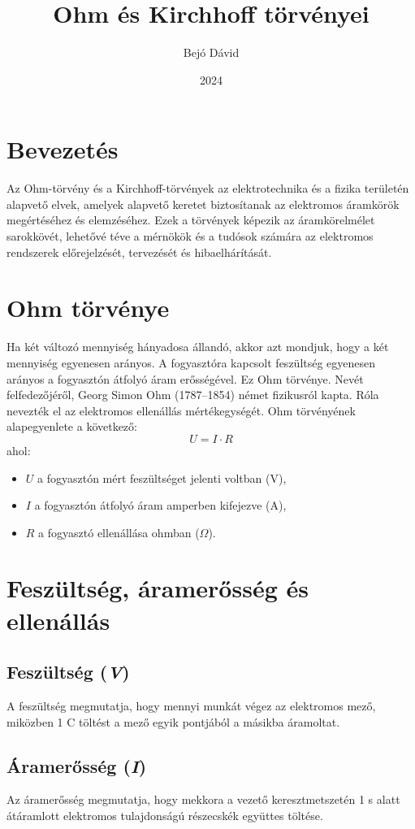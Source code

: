 \documentclass{article}
\title{Ohm és Kirchhoff törvényei}
\author{Bejó Dávid}
\date{2024}
\begin{document}
\maketitle

\section{Bevezetés}
Az Ohm-törvény és a Kirchhoff-törvények az elektrotechnika és a fizika területén alapvető elvek, amelyek alapvető keretet biztosítanak az elektromos áramkörök megértéséhez és elemzéséhez. Ezek a törvények képezik az áramkörelmélet sarokkövét, lehetővé téve a mérnökök és a tudósok számára az elektromos rendszerek előrejelzését, tervezését és hibaelhárítását.

\section{Ohm törvénye}
Ha két változó mennyiség hányadosa állandó, akkor azt mondjuk, hogy a két mennyiség egyenesen arányos. A fogyasztóra kapcsolt feszültség egyenesen arányos a fogyasztón átfolyó áram erősségével. \cite{ohm} Ez Ohm törvénye. Nevét felfedezőjéről, Georg Simon Ohm (1787–1854) német fizikusról kapta. Róla nevezték el az elektromos ellenállás mértékegységét. Ohm törvényének alapegyenlete a következő:
\begin{equation}
    U = I \cdot R
\end{equation}
ahol:
\begin{itemize}
    \item $U$ a fogyasztón mért feszültséget jelenti voltban (V),
    \item $I$ a fogyasztón átfolyó áram amperben kifejezve (A),
    \item $R$ a fogyasztó ellenállása ohmban ($\Omega$).
\end{itemize}

\section{Feszültség, áramerősség és ellenállás}
\subsection{Feszültség (\textit{V})}
A feszültség megmutatja, hogy mennyi munkát végez az elektromos mező, miközben 1 C töltést a mező egyik pontjából a másikba áramoltat.

\subsection{Áramerősség (\textit{I})}
Az áramerősség megmutatja, hogy mekkora a vezető keresztmetszetén 1 s alatt átáramlott elektromos tulajdonságú részecskék együttes töltése.
\end{document}
